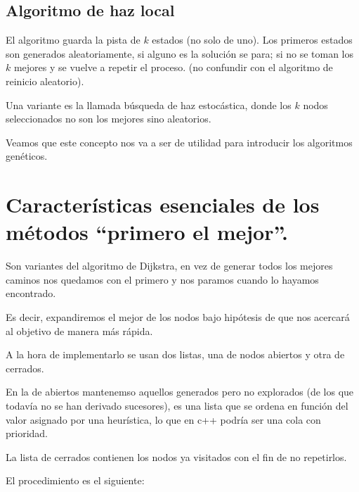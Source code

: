 \documentclass[12 pt, a4paper]{article}
\begin{document}
  \subsection{Algoritmo de haz local}  

  El algoritmo guarda la pista de $k$ estados (no solo de uno). Los primeros estados son generados aleatoriamente, si alguno es la solución se para; 
  si no se toman los $k$ mejores y se vuelve a repetir el proceso. 
  (no confundir con el algoritmo de reinicio aleatorio).

  Una variante es la llamada búsqueda de haz estocástica, donde los $k$ nodos seleccionados no son los mejores sino aleatorios. 

  Veamos que este concepto nos va a ser de utilidad para introducir los algoritmos genéticos.


\newpage

\section{Características esenciales de los métodos “primero el mejor”.}

Son variantes del algoritmo de Dijkstra, en vez de generar todos los mejores caminos nos quedamos 
con el primero y nos paramos cuando lo hayamos encontrado.  

Es decir, expandiremos el mejor de los nodos bajo hipótesis de que nos acercará al objetivo de manera
más rápida. 

A la hora de implementarlo se usan dos listas, una de nodos abiertos y otra de cerrados. 

En la de abiertos mantenemso aquellos generados pero no explorados (de los que todavía no se han derivado sucesores), 
es una lista que se ordena en función del valor asignado por una heurística, lo que en c++ podría ser 
una cola con prioridad. 



La lista de cerrados contienen los nodos ya visitados con el fin de no repetirlos. 

El procedimiento es el siguiente:
\end{document}
